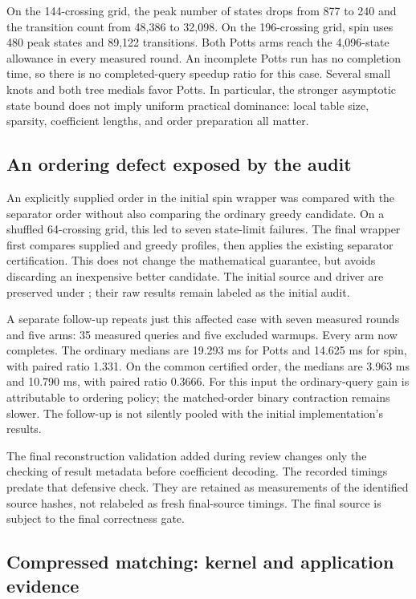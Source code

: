 \documentclass[11pt]{article}
\theoremstyle{definition}
\theoremstyle{remark}
\begin{document}
On the 144-crossing grid, the peak number of states drops from 877 to 240
and the transition count from 48,386 to 32,098. On the 196-crossing grid,
spin uses 480 peak states and 89,122 transitions. Both Potts arms reach the
4,096-state allowance in every measured round. An incomplete Potts run has
no completion time, so there is no completed-query speedup ratio for this
case. Several small knots and both tree medials favor Potts. In particular,
the stronger asymptotic state bound does not imply uniform practical
dominance: local table size, sparsity, coefficient lengths, and order
preparation all matter.

\subsection{An ordering defect exposed by the audit}

An explicitly supplied order in the initial spin wrapper was compared
with the separator order without also comparing the ordinary greedy
candidate. On a shuffled 64-crossing grid, this led to seven state-limit
failures. The final wrapper first compares supplied and greedy profiles,
then applies the existing separator certification. This does not change
the mathematical guarantee, but avoids discarding an inexpensive better
candidate. The initial source and driver are preserved under
; their raw results remain labeled
as the initial audit.

A separate follow-up repeats just this affected case with seven measured
rounds and five arms: 35 measured queries and five excluded warmups. Every
arm now completes. The ordinary medians are 19.293 ms for Potts and
14.625 ms for spin, with paired ratio 1.331. On the common certified order,
the medians are 3.963 ms and 10.790 ms, with paired ratio 0.3666.
For this input the ordinary-query gain is attributable to ordering policy;
the matched-order binary contraction remains slower. The follow-up is not
silently pooled with the initial implementation's results.

The final reconstruction validation added during review changes only
the checking of result metadata before coefficient decoding. The recorded
timings predate that defensive check. They are retained as measurements of
the identified source hashes, not relabeled as fresh final-source timings.
The final source is subject to the final correctness gate.

\subsection{Compressed matching: kernel and application evidence}
\end{document}
